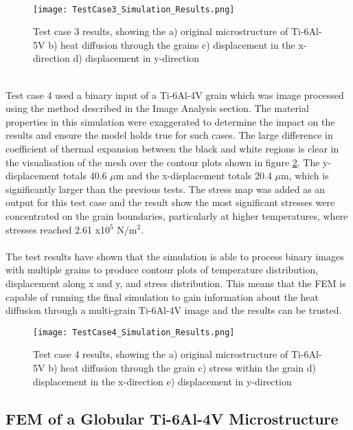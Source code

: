 \documentclass[report.tex]{subfiles}
\begin{document}
\\
\begin{figure}[htp]
    \centering
    \texttt{[image: TestCase3\_Simulation\_Results.png]}
    \caption{Test case 3 results, showing the a) original microstructure of Ti-6Al-5V b) heat diffusion through the grains c) displacement in the x-direction d) displacement in y-direction}
    \label{fig:TestCase3Results}
\end{figure}
\\
Test case 4 used a binary input of a Ti-6Al-4V grain which was image processed using the method described in the Image Analysis section. The material properties in this simulation were exaggerated to determine the impact on the results and ensure the model holds true for such cases. The large difference in coefficient of thermal expansion between the black and white regions is clear in the visualisation of the mesh over the contour plots shown in figure \ref{fig:TestCase4Results}. The y-displacement totals 40.6 $\mu$m and the x-displacement totals 20.4 $\mu$m, which is significantly larger than the previous tests. The stress map was added as an output for this test case and the result show the most significant stresses were concentrated on the grain boundaries, particularly at higher temperatures, where stresses reached 2.61 x10$^5$ N/m$^2$.\\
\\
The test results have shown that the simulation is able to process binary images with multiple grains to produce contour plots of temperature distribution, displacement along x and y, and stress distribution. This means that the FEM is capable of running the final simulation to gain information about the heat diffusion through a multi-grain Ti-6Al-4V image and the results can be trusted.
\\
\begin{figure}[htp]
    \centering
    \texttt{[image: TestCase4\_Simulation\_Results.png]}
    \caption{Test case 4 results, showing the a) original microstructure of Ti-6Al-5V b) heat diffusion through the grain c) stress within the grain d) displacement in the x-direction e) displacement in y-direction}
    \label{fig:TestCase4Results}
\end{figure}

\clearpage
\subsection{FEM of a Globular Ti-6Al-4V Microstructure}
\end{document}
